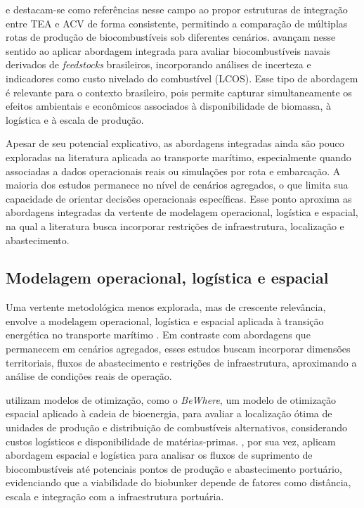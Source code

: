 \citet{tan_biofuel_2021} e \citet{li_techno-economic_2022} destacam-se como referências nesse campo ao propor estruturas de integração entre \gls{TEA} e \gls{ACV} de forma consistente, permitindo a comparação de múltiplas rotas de produção de biocombustíveis sob diferentes cenários. \citet{cesilla_de_souza_technical-economic_2024} avançam nesse sentido ao aplicar abordagem integrada para avaliar biocombustíveis navais derivados de \emph{feedstocks} brasileiros, incorporando análises de incerteza e indicadores como custo nivelado do combustível (\gls{LCOS}). Esse tipo de abordagem é relevante para o contexto brasileiro, pois permite capturar simultaneamente os efeitos ambientais e econômicos associados à disponibilidade de biomassa, à logística e à escala de produção.

Apesar de seu potencial explicativo, as abordagens integradas ainda são pouco exploradas na literatura aplicada ao transporte marítimo, especialmente quando associadas a dados operacionais reais ou simulações por rota e embarcação. A maioria dos estudos permanece no nível de cenários agregados, o que limita sua capacidade de orientar decisões operacionais específicas. Esse ponto aproxima as abordagens integradas da vertente de modelagem operacional, logística e espacial, na qual a literatura busca incorporar restrições de infraestrutura, localização e abastecimento.

\subsection{Modelagem operacional, logística e espacial}
Uma vertente metodológica menos explorada, mas de crescente relevância, envolve a modelagem operacional, logística e espacial aplicada à transição energética no transporte marítimo \citep{harahap_renewable_2023,carvalho_biofuels_2021,cesilla_de_souza_technical-economic_2024}. Em contraste com abordagens que permanecem em cenários agregados, esses estudos buscam incorporar dimensões territoriais, fluxos de abastecimento e restrições de infraestrutura, aproximando a análise de condições reais de operação.

\citet{harahap_renewable_2023} utilizam modelos de otimização, como o \emph{BeWhere}, um modelo de otimização espacial aplicado à cadeia de bioenergia, para avaliar a localização ótima de unidades de produção e distribuição de combustíveis alternativos, considerando custos logísticos e disponibilidade de matérias-primas. \citet{carvalho_biofuels_2021}, por sua vez, aplicam abordagem espacial e logística para analisar os fluxos de suprimento de biocombustíveis até potenciais pontos de produção e abastecimento portuário, evidenciando que a viabilidade do biobunker depende de fatores como distância, escala e integração com a infraestrutura portuária.

